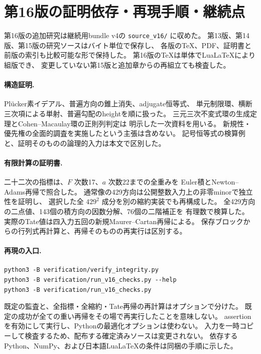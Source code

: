\documentclass[a4paper,11pt]{ltjsarticle}
\theoremstyle{definition}
\begin{document}
\section{第16版の証明依存・再現手順・継続点}
\label{app:v16-reproducibility}

第16版の追加研究は継続用bundle v4の \texttt{source\_v16/} に収めた。
第13版、第14版、第15版の研究ソースはバイト単位で保存し、
各版のTeX、PDF、証明書と前版の索引も比較可能な形で保持した。
第16版のTeXは単体でLuaLaTeXにより組版でき、
変更していない第15版と追加章からの再組立ても検査した。

\paragraph{構造証明.}
Pl\"ucker素イデアル、普遍方向の錐上消失、adjugate恒等式、
単元制限環、横断三次項による単射、普遍勾配のheightを順に扱った。
三元三次不変式環の生成定理とCohen--Macaulay環の正則列判定は
明示した一次資料を用いる。
新規性・優先権の全面的調査を実施したという主張は含めない。
記号恒等式の検算例と、証明そのものの論理的入力は本文で区別した。

\paragraph{有限計算の証明書.}
二十二次の指標は、$F$ 次数17、$a$ 次数22までの全重みを
Euler積とNewton--Adams再帰で照合した。
通常像の429方向は公開整数入力上の非零minorで独立性を証明し、
選択した全 $429^2$ 成分を別の縮約実装でも再構成した。
全429方向の二点値、143個の積方向の因数分解、76個の二階補正を
有理数で検算した。
実際のTate値は四入力五回の新規Maurer--Cartan再帰による。
保存ブロックからの行列式再計算と、再帰そのものの再実行は区別する。

\paragraph{再現の入口.}
\begin{verbatim}
python3 -B verification/verify_integrity.py
python3 -B verification/run_v16_checks.py --help
python3 -B verification/run_v16_checks.py
\end{verbatim}
既定の監査と、全指標・全縮約・Tate再帰の再計算はオプションで分けた。
既定の成功が全ての重い再帰をその場で再実行したことを意味しない。
assertionを有効にして実行し、Pythonの最適化オプションは使わない。
入力を一時コピーして検査するため、配布する確定済みソースは変更されない。
依存するPython、NumPy、および日本語LuaLaTeXの条件は同梱の手順に示した。
\end{document}
